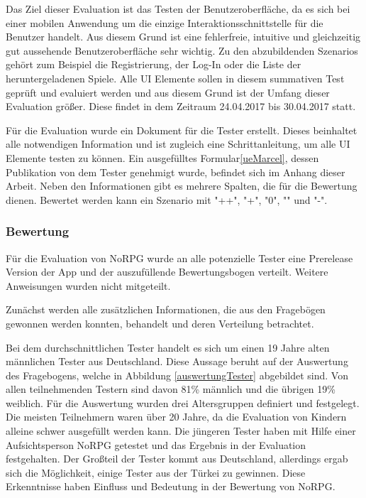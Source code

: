 				Das Ziel dieser Evaluation ist das Testen der Benutzeroberfläche, da es sich bei einer mobilen Anwendung um die einzige Interaktionsschnittstelle für die Benutzer handelt. Aus diesem Grund ist eine fehlerfreie, intuitive und gleichzeitig gut aussehende Benutzeroberfläche sehr wichtig. Zu den abzubildenden Szenarios gehört zum Beispiel die Registrierung, der Log-In oder die Liste der heruntergeladenen Spiele. Alle \ac{UI} Elemente sollen in diesem summativen Test geprüft und evaluiert werden und aus diesem Grund ist der Umfang dieser Evaluation größer. Diese findet in dem Zeitraum 24.04.2017 bis 30.04.2017 statt.

				Für die Evaluation wurde ein Dokument für die Tester erstellt. Dieses beinhaltet alle notwendigen Information und ist zugleich eine Schrittanleitung, um alle \ac{UI} Elemente testen zu können. Ein ausgefülltes Formular\ref{ueMarcel}, dessen Publikation von dem Tester genehmigt wurde, befindet sich im Anhang dieser Arbeit. Neben den Informationen gibt es mehrere Spalten, die für die Bewertung dienen. Bewertet werden kann ein Szenario mit "++", "+", "0", "\-" und "\--".

			\subsubsection{Bewertung}
				Für die Evaluation von NoRPG wurde an alle potenzielle Tester eine Prerelease Version der App und der auszufüllende Bewertungsbogen verteilt. Weitere Anweisungen wurden nicht mitgeteilt.

				Zunächst werden alle zusätzlichen Informationen, die aus den Fragebögen gewonnen werden konnten, behandelt und deren Verteilung betrachtet.

				Bei dem durchschnittlichen Tester handelt es sich um einen 19 Jahre alten männlichen Tester aus Deutschland. Diese Aussage beruht auf der Auswertung des Fragebogens, welche in Abbildung \ref{auswertungTester} abgebildet sind. Von allen teilnehmenden Testern sind davon 81\% männlich und die übrigen 19\% weiblich. Für die Auswertung wurden drei Altersgruppen definiert und festgelegt. Die meisten Teilnehmern waren über 20 Jahre, da die Evaluation von Kindern alleine schwer ausgefüllt werden kann. Die jüngeren Tester haben mit Hilfe einer Aufsichtsperson NoRPG getestet und das Ergebnis in der Evaluation festgehalten. Der Großteil der Tester kommt aus Deutschland, allerdings ergab sich die Möglichkeit, einige Tester aus der Türkei zu gewinnen. Diese Erkenntnisse haben Einfluss und Bedeutung in der Bewertung von NoRPG.


